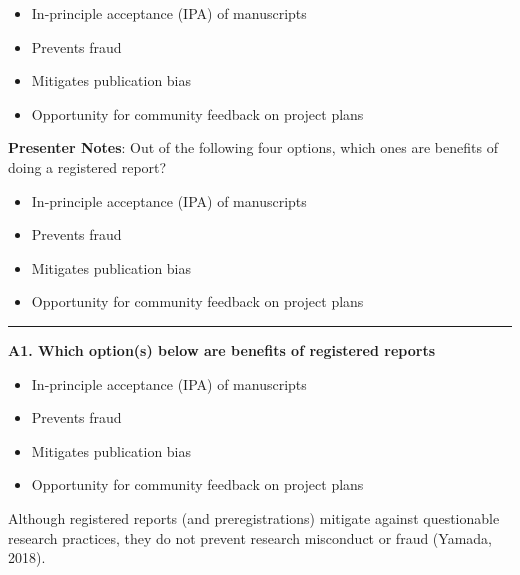 \documentclass[
  letterpaper,
  DIV=11,
  numbers=noendperiod]{scrartcl}
\providecommand{\tightlist}{%
  \setlength{\itemsep}{0pt}\setlength{\parskip}{0pt}}
\begin{document}
\begin{itemize}
\tightlist
\item[$\square$]
  In-principle acceptance (IPA) of manuscripts
\item[$\square$]
  Prevents fraud
\item[$\square$]
  Mitigates publication bias
\item[$\square$]
  Opportunity for community feedback on project plans
\end{itemize}

\textbf{Presenter Notes}: Out of the following four options, which ones
are benefits of doing a registered report?

\begin{itemize}
\tightlist
\item
  In-principle acceptance (IPA) of manuscripts
\item
  Prevents fraud
\item
  Mitigates publication bias
\item
  Opportunity for community feedback on project plans
\end{itemize}

\begin{center}\rule{0.5\linewidth}{0.5pt}\end{center}

\textbf{A1. Which option(s) below are benefits of registered reports}

\begin{itemize}
\tightlist
\item[$\boxtimes$]
  In-principle acceptance (IPA) of manuscripts
\item[$\square$]
  Prevents fraud
\item[$\boxtimes$]
  Mitigates publication bias
\item[$\boxtimes$]
  Opportunity for community feedback on project plans
\end{itemize}

\begin{tcolorbox}[enhanced jigsaw, arc=.35mm, bottomrule=.15mm, bottomtitle=1mm, breakable, colback=white, colbacktitle=quarto-callout-note-color!10!white, colframe=quarto-callout-note-color-frame, coltitle=black, left=2mm, leftrule=.75mm, opacityback=0, opacitybacktitle=0.6, rightrule=.15mm, title=\textcolor{quarto-callout-note-color}{\faInfo}\hspace{0.5em}{Reflecting on answer}, titlerule=0mm, toprule=.15mm, toptitle=1mm]

Although registered reports (and preregistrations) mitigate against
questionable research practices, they do not prevent research misconduct
or fraud (Yamada, 2018).

\end{tcolorbox}
\end{document}
